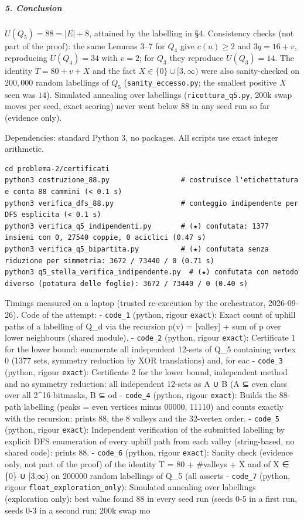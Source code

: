 \subparagraph{5. Conclusion}\label{conclusion}

\(U(Q_5)=88=|E|+8\), attained by the labelling in §4. Consistency checks
(not part of the proof): the same Lemmas 3--7 for \(Q_4\) give
\(c(u)\ge2\) and \(3q=16+v\), reproducing \(U(Q_4)=34\) with \(v=2\);
for \(Q_3\) they reproduce \(U(Q_3)=14\). The identity \(T=80+v+X\) and
the fact \(X\in\{0\}\cup[3,\infty)\) were also sanity-checked on
\(200{,}000\) random labellings of \(Q_5\) (\texttt{sanity\_eccesso.py};
the smallest positive \(X\) seen was \(14\)). Simulated annealing over
labellings (\texttt{ricottura\_q5.py}, 200k swap moves per seed, exact
scoring) never went below \(88\) in any seed run so far (evidence only).


Dependencies: standard Python 3, no packages. All scripts use exact
integer arithmetic.

\begin{verbatim}
cd problema-2/certificati
python3 costruzione_88.py                 # costruisce l'etichettatura e conta 88 cammini (< 0.1 s)
python3 verifica_dfs_88.py                # conteggio indipendente per DFS esplicita (< 0.1 s)
python3 verifica_q5_indipendenti.py       # (★) confutata: 1377 insiemi con 0, 27540 coppie, 0 aciclici (0.47 s)
python3 verifica_q5_bipartita.py          # (★) confutata senza riduzione per simmetria: 3672 / 73440 / 0 (0.71 s)
python3 q5_stella_verifica_indipendente.py  # (★) confutata con metodo diverso (potatura delle foglie): 3672 / 73440 / 0 (0.40 s)
\end{verbatim}

Timings measured on a laptop (trusted re-execution by the orchestrator,
2026-09-26). Code of the attempt: - \texttt{code\_1} (python, rigour
\texttt{exact}): Exact count of uphill paths of a labelling of Q\_d via
the recursion p(v) = {[}valley{]} + sum of p over lower neighbours
(shared module). - \texttt{code\_2} (python, rigour \texttt{exact}):
Certificate 1 for the lower bound: enumerate all independent 12-sets of
Q\_5 containing vertex 0 (1377 sets, symmetry reduction by XOR
translations) and, for eac - \texttt{code\_3} (python, rigour
\texttt{exact}): Certificate 2 for the lower bound, independent method
and no symmetry reduction: all independent 12-sets as A ∪ B (A ⊆ even
class over all 2\^{}16 bitmasks, B ⊆ od - \texttt{code\_4} (python,
rigour \texttt{exact}): Builds the 88-path labelling (peaks = even
vertices minus 00000, 11110) and counts exactly with the recursion:
prints 88, the 8 valleys and the 32-vertex order. - \texttt{code\_5}
(python, rigour \texttt{exact}): Independent verification of the
submitted labelling by explicit DFS enumeration of every uphill path
from each valley (string-based, no shared code): prints 88. -
\texttt{code\_6} (python, rigour \texttt{exact}): Sanity check (evidence
only, not part of the proof) of the identity T = 80 + \#valleys + X and
of X ∈ \{0\} ∪ {[}3,∞) on 200000 random labellings of Q\_5 (all asserts
- \texttt{code\_7} (python, rigour \texttt{float\_exploration\_only}):
Simulated annealing over labellings (exploration only): best value found
88 in every seed run (seeds 0-5 in a first run, seeds 0-3 in a second
run; 200k swap mo


